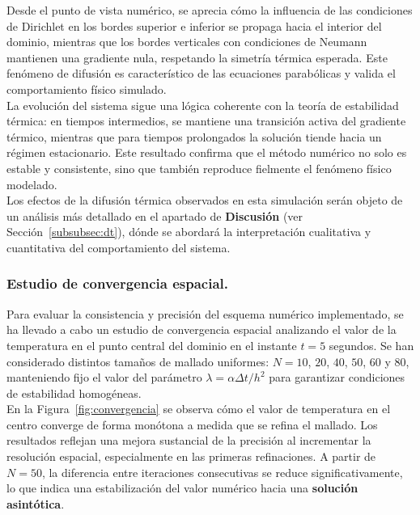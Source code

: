 \documentclass{article}
\begin{document}
Desde el punto de vista numérico, se aprecia cómo la influencia de las condiciones de Dirichlet en los bordes superior e inferior se propaga hacia el interior del dominio, mientras que los bordes verticales con condiciones de Neumann mantienen una gradiente nula, respetando la simetría térmica esperada. Este fenómeno de difusión es característico de las ecuaciones parabólicas y valida el comportamiento físico simulado.\\

La evolución del sistema sigue una lógica coherente con la teoría de estabilidad térmica: en tiempos intermedios, se mantiene una transición activa del gradiente térmico, mientras que para tiempos prolongados la solución tiende hacia un régimen estacionario. Este resultado confirma que el método numérico no solo es estable y consistente, sino que también reproduce fielmente el fenómeno físico modelado.\\


\noindent Los efectos de la difusión térmica observados en esta simulación serán objeto de un análisis más detallado en el apartado de \textbf{Discusión} (ver Sección~\ref{subsubsec:dt}), dónde se abordará la interpretación cualitativa y cuantitativa del comportamiento del sistema.

\subsubsection{Estudio de convergencia espacial.}
Para evaluar la consistencia y precisión del esquema numérico implementado, se ha llevado a cabo un estudio de convergencia espacial analizando el valor de la temperatura en el punto central del dominio en el instante $t = 5$ segundos. Se han considerado distintos tamaños de mallado uniformes: $N = 10$, $20$, $40$, $50$, $60$ y $80$, manteniendo fijo el valor del parámetro $\lambda = \alpha \Delta t / h^2$ para garantizar condiciones de estabilidad homogéneas.\\

En la Figura~\ref{fig:convergencia} se observa cómo el valor de temperatura en el centro converge de forma monótona a medida que se refina el mallado. Los resultados reflejan una mejora sustancial de la precisión al incrementar la resolución espacial, especialmente en las primeras refinaciones. A partir de $N = 50$, la diferencia entre iteraciones consecutivas se reduce significativamente, lo que indica una estabilización del valor numérico hacia una \textbf{solución asintótica}.\\
\end{document}
